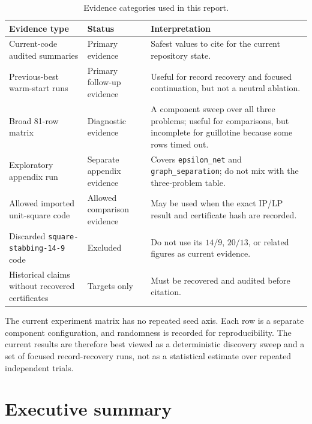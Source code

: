 \documentclass[11pt]{article}
\newcommand{\code}[1]{\texttt{#1}}
\begin{document}
\begin{table}[htbp]
\centering
\caption{Evidence categories used in this report.}
\begin{tabularx}{\textwidth}{p{}p{}X}
\toprule
Evidence type & Status & Interpretation \\
\midrule
Current-code audited summaries & Primary evidence & Safest values to cite
for the current repository state. \\
Previous-best warm-start runs & Primary follow-up evidence & Useful for
record recovery and focused continuation, but not a neutral ablation. \\
Broad 81-row matrix & Diagnostic evidence & A component sweep over all
three problems; useful for comparisons, but incomplete for guillotine because
some rows timed out. \\
Exploratory appendix run & Separate appendix evidence & Covers
\code{epsilon\_net} and \code{graph\_separation}; do not mix with the
three-problem table. \\
Allowed imported unit-square code & Allowed comparison evidence & May be used
when the exact IP/LP result and certificate hash are recorded. \\
Discarded \code{square-stabbing-14-9} code & Excluded & Do not use its
$14/9$, $20/13$, or related figures as current evidence. \\
Historical claims without recovered certificates & Targets only & Must be
recovered and audited before citation. \\
\bottomrule
\end{tabularx}
\end{table}

The current experiment matrix has no repeated seed axis.  Each row is a
separate component configuration, and randomness is recorded for
reproducibility.  The current results are therefore best viewed as a
deterministic discovery sweep and a set of focused record-recovery runs, not as
a statistical estimate over repeated independent trials.

\section{Executive summary}
\end{document}
